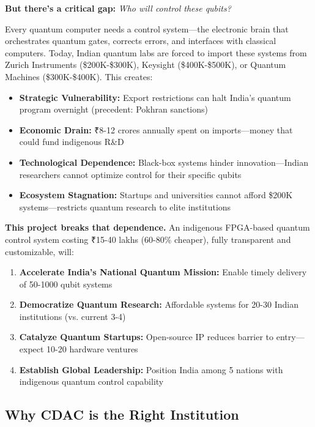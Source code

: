 \documentclass[12pt,a4paper]{article}
\begin{document}
\begin{enumerate}[leftmargin=*]
\textbf{But there's a critical gap:} \textit{Who will control these qubits?}

Every quantum computer needs a control system—the electronic brain that orchestrates quantum gates, corrects errors, and interfaces with classical computers. Today, Indian quantum labs are forced to import these systems from Zurich Instruments (\$200K-\$300K), Keysight (\$400K-\$500K), or Quantum Machines (\$300K-\$400K). This creates:

\begin{itemize}[leftmargin=*]
    \item \textbf{Strategic Vulnerability:} Export restrictions can halt India's quantum program overnight (precedent: Pokhran sanctions)
    \item \textbf{Economic Drain:} ₹8-12 crores annually spent on imports—money that could fund indigenous R\&D
    \item \textbf{Technological Dependence:} Black-box systems hinder innovation—Indian researchers cannot optimize control for their specific qubits
    \item \textbf{Ecosystem Stagnation:} Startups and universities cannot afford \$200K systems—restricts quantum research to elite institutions
\end{itemize}

\textbf{This project breaks that dependence.} An indigenous FPGA-based quantum control system costing ₹15-40 lakhs (60-80\% cheaper), fully transparent and customizable, will:

\begin{enumerate}[leftmargin=*]
    \item \textbf{Accelerate India's National Quantum Mission:} Enable timely delivery of 50-1000 qubit systems
    \item \textbf{Democratize Quantum Research:} Affordable systems for 20-30 Indian institutions (vs. current 3-4)
    \item \textbf{Catalyze Quantum Startups:} Open-source IP reduces barrier to entry—expect 10-20 hardware ventures
    \item \textbf{Establish Global Leadership:} Position India among 5 nations with indigenous quantum control capability
\end{enumerate}

\subsection{Why CDAC is the Right Institution}


\end{enumerate}
\end{document}
